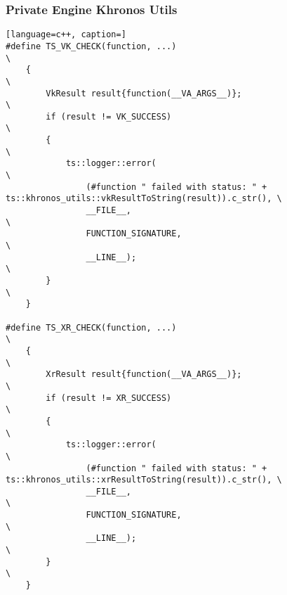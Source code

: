 \newpage

\subsubsection{Private Engine Khronos Utils}
\label{sec:khronos_utils}
\begin{lstlisting}[language=c++, caption=]
#define TS_VK_CHECK(function, ...)                                                                         \
    {                                                                                                      \
        VkResult result{function(__VA_ARGS__)};                                                            \
        if (result != VK_SUCCESS)                                                                          \
        {                                                                                                  \
            ts::logger::error(                                                                             \
                (#function " failed with status: " + ts::khronos_utils::vkResultToString(result)).c_str(), \
                __FILE__,                                                                                  \
                FUNCTION_SIGNATURE,                                                                        \
                __LINE__);                                                                                 \
        }                                                                                                  \
    }

#define TS_XR_CHECK(function, ...)                                                                         \
    {                                                                                                      \
        XrResult result{function(__VA_ARGS__)};                                                            \
        if (result != XR_SUCCESS)                                                                          \
        {                                                                                                  \
            ts::logger::error(                                                                             \
                (#function " failed with status: " + ts::khronos_utils::xrResultToString(result)).c_str(), \
                __FILE__,                                                                                  \
                FUNCTION_SIGNATURE,                                                                        \
                __LINE__);                                                                                 \
        }                                                                                                  \
    }


\end{lstlisting}
